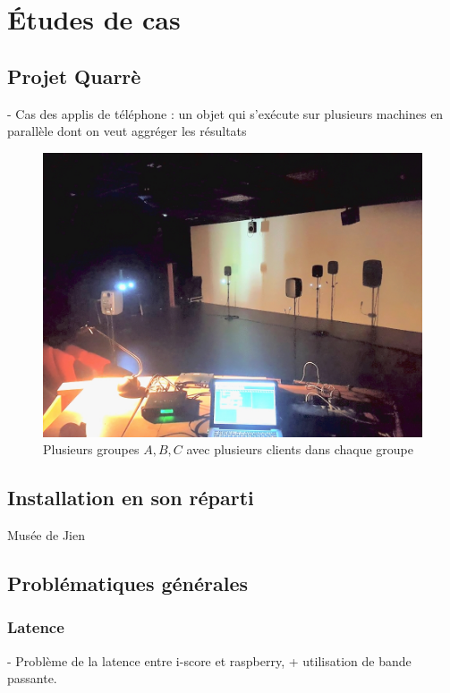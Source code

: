 \documentclass{article}
\begin{document}
\section{Études de cas}

\subsection{Projet Quarrè}
- Cas des applis de téléphone : un objet qui s'exécute sur plusieurs machines en parallèle dont on veut aggréger les résultats


\begin{figure}[h]
    \centering
    \includegraphics[scale=0.2]{images/quarre.jpg}
    \caption{Plusieurs groupes $A,B,C$ avec plusieurs clients dans chaque groupe}
    \label{img.groupes}
\end{figure}

\subsection{Installation en son réparti}
Musée de Jien

\subsection{Problématiques générales}
\subsubsection{Latence}
- Problème de la latence entre i-score et raspberry, + utilisation de bande passante.
\end{document}
